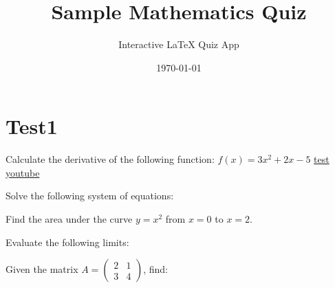 \documentclass[12pt]{exam}
\title{Sample Mathematics Quiz}
\author{Interactive LaTeX Quiz App}
\date{\today}
\begin{document}
\maketitle


\section{Test1}
\begin{questions}

\question Calculate the derivative of the following function: $f(x) = 3x^2 + 2x - 5$
\href{https://www.youtube.com/watch?v=spUNpyF58BY&t=523s}{test youtube}

\question Solve the following system of equations:

\question Find the area under the curve $y = x^2$ from $x = 0$ to $x = 2$.

\question Evaluate the following limits:

\question Given the matrix $A = \begin{pmatrix} 2 & 1 \\ 3 & 4 \end{pmatrix}$, find:
\end{questions}
\end{document}
